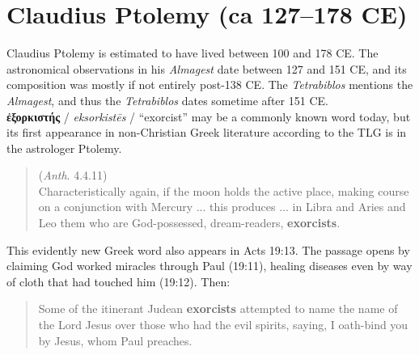 %
%
\chapter{Claudius Ptolemy (ca 127--178 CE)}%
\vspace*{3mm}%
\justifying%
%
\noindent{}Claudius Ptolemy is estimated to have lived between 100 and 178 CE. %
The astronomical observations in his \textit{Almagest} %
date between 127 and 151 CE, %
and its composition was mostly if not entirely post-138 CE. %
The \textit{Tetrabiblos} mentions the \textit{Almagest}, %
and thus the \textit{Tetrabiblos} dates sometime after 151 CE. \\[1mm]%

\noindent{}\textbf{ἐξορκιστής} / \textit{eksorkistēs} / “exorcist” may be a commonly known word today, %
but its first appearance in non-Christian Greek literature according to the TLG is %
in the astrologer Ptolemy. %

\vspace*{3mm} 
 \begin{quote} (\textit{Anth}. 4.4.11) \\[1mm] %
 Characteristically again, if the moon holds the active place, %
 making course on a conjunction with Mercury %
 ... this produces ... in Libra and Aries and Leo them who are God-possessed, dream-readers, \textbf{exorcists}. %
 \end{quote} %
 \vspace*{3mm}
 
 \noindent{}This evidently new Greek word also appears in Acts 19:13. %
 The passage opens by claiming God worked miracles through Paul (19:11), %
 healing diseases even by way of cloth that had touched him (19:12). %
 Then:

\vspace*{3mm} 
 \begin{quote} \clearpage %
 Some of the itinerant Judean \textbf{exorcists} attempted to name the name of the Lord Jesus %
 over those who had the evil spirits, saying, %
 I oath-bind you by Jesus, whom Paul preaches. \end{quote} %
 \vspace*{3mm}

